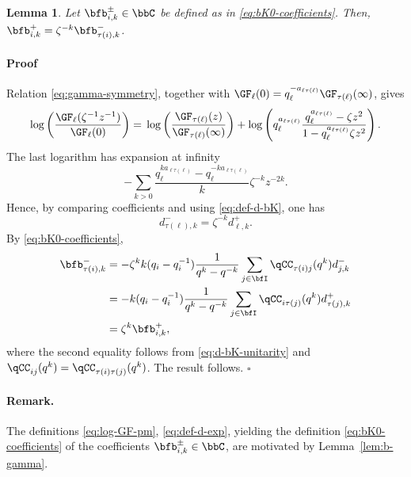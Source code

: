 \documentclass[reqno]{amsart}
\numberwithin{equation}{section}
\newtheorem*{lemma}{Lemma}
\newenvironment{pf}{\medskip\paragraph{{\sc Proof}}}{\hfill$\square$\par\medskip}
\newenvironment{remark}{\medskip\paragraph{{\bf Remark.}}}{\par\medskip}
\begin{document}
\begin{lemma}\label{lem:bK0-coeff-b}
Let $\bfb_{i,k}^\pm\in\bbC$ be defined as in \eqref{eq:bK0-coefficients}.
Then, $\bfb_{i,k}^{+}=\zeta^{-k}\bfb_{\tau(i),k}^{-}$.
\end{lemma}
\begin{pf}
Relation \eqref{eq:gamma-symmetry}, together with
$\GF_\ell(0)=q_\ell^{-a_{\ell\tau(\ell)}}
\GF_{\tau(\ell)}(\infty)$, gives
\begin{equation}
	\log\left(
	\frac{\GF_\ell(\zeta^{-1}z^{-1})}{\GF_\ell(0)}
	\right)
	={}
	\log\left(
	\frac{\GF_{\tau(\ell)}(z)}
	{\GF_{\tau(\ell)}(\infty)}
	\right)
	+
	\log\left(
	q_\ell^{a_{\ell\tau(\ell)}}
	\frac{q_\ell^{a_{\ell\tau(\ell)}}-\zeta z^2}
	{1-q_\ell^{a_{\ell\tau(\ell)}}\zeta z^2}
	\right).
\end{equation}
The last logarithm has expansion at infinity
\[
-\sum_{k>0}
\frac{q_\ell^{ka_{\ell\tau(\ell)}}
	-q_\ell^{-ka_{\ell\tau(\ell)}}}{k}
\zeta^{-k}z^{-2k}.
\]
Hence, by comparing coefficients and using \eqref{eq:def-d-bK}, one has
\begin{equation}\label{eq:d-bK-unitarity}
	d_{\tau(\ell),k}^{-}=\zeta^{-k}d_{\ell,k}^{+}.
\end{equation}
By \eqref{eq:bK0-coefficients},
\begin{align}
	\bfb_{\tau(i),k}^{-}
	&=
	-\zeta^{k}
	k(q_i-q_i^{-1})
	\frac{1}{q^k-q^{-k}}
	\sum_{j\in\bfI}
	\qCC_{\tau(i)j}(q^k)d_{j,k}^{-}\\
	&=
	-k(q_i-q_i^{-1})
	\frac{1}{q^k-q^{-k}}
	\sum_{j\in\bfI}
	\qCC_{i\tau(j)}(q^k)d_{\tau(j),k}^{+}\\
	&=
	\zeta^{k}\bfb^+_{i,k},
\end{align}
where the second equality follows from \eqref{eq:d-bK-unitarity} and 
$\qCC_{ij}(q^k)=\qCC_{\tau(i)\tau(j)}(q^k)$. The result follows.
\end{pf}

\begin{remark}
The definitions \eqref{eq:log-GF-pm}, \eqref{eq:def-d-exp}, yielding the definition \eqref{eq:bK0-coefficients} of the coefficients $\bfb_{i,k}^\pm\in\bbC$, are motivated by Lemma~\ref{lem:b-gamma}.
\hfill\rmkend
\end{remark}

\end{document}
